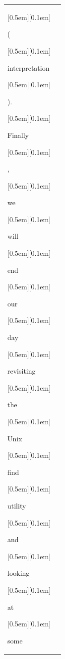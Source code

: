 \begin{table}[ht]
\begin{tabular}{@{}l p{13cm}@{}}
{\setlength{\fboxsep}{1pt}\raisebox{0pt}[0.5em][0.1em]{\colorbox{SkyBlue!55}{\strut{ (}}}}{\setlength{\fboxsep}{1pt}\raisebox{0pt}[0.5em][0.1em]{\colorbox{Salmon!60}{\strut{interpretation}}}}{\setlength{\fboxsep}{1pt}\raisebox{0pt}[0.5em][0.1em]{\colorbox{DarkOrchid!25}{\strut{).}}}}{\setlength{\fboxsep}{1pt}\raisebox{0pt}[0.5em][0.1em]{\colorbox{DarkOrchid!25}{\strut{ Finally}}}}{\setlength{\fboxsep}{1pt}\raisebox{0pt}[0.5em][0.1em]{\colorbox{DarkOrchid!25}{\strut{,}}}}{\setlength{\fboxsep}{1pt}\raisebox{0pt}[0.5em][0.1em]{\colorbox{DarkOrchid!25}{\strut{ we}}}}{\setlength{\fboxsep}{1pt}\raisebox{0pt}[0.5em][0.1em]{\colorbox{Salmon!60}{\strut{ will}}}}{\setlength{\fboxsep}{1pt}\raisebox{0pt}[0.5em][0.1em]{\colorbox{DarkOrchid!25}{\strut{ end}}}}{\setlength{\fboxsep}{1pt}\raisebox{0pt}[0.5em][0.1em]{\colorbox{SkyBlue!55}{\strut{ our}}}}{\setlength{\fboxsep}{1pt}\raisebox{0pt}[0.5em][0.1em]{\colorbox{Salmon!60}{\strut{ day}}}}{\setlength{\fboxsep}{1pt}\raisebox{0pt}[0.5em][0.1em]{\colorbox{SkyBlue!55}{\strut{ revisiting}}}}{\setlength{\fboxsep}{1pt}\raisebox{0pt}[0.5em][0.1em]{\colorbox{SkyBlue!55}{\strut{ the}}}}{\setlength{\fboxsep}{1pt}\raisebox{0pt}[0.5em][0.1em]{\colorbox{Salmon!60}{\strut{ Unix}}}}{\setlength{\fboxsep}{1pt}\raisebox{0pt}[0.5em][0.1em]{\colorbox{Salmon!60}{\strut{ find}}}}{\setlength{\fboxsep}{1pt}\raisebox{0pt}[0.5em][0.1em]{\colorbox{Salmon!60}{\strut{ utility}}}}{\setlength{\fboxsep}{1pt}\raisebox{0pt}[0.5em][0.1em]{\colorbox{SkyBlue!55}{\strut{ and}}}}{\setlength{\fboxsep}{1pt}\raisebox{0pt}[0.5em][0.1em]{\colorbox{DarkOrchid!25}{\strut{ looking}}}}{\setlength{\fboxsep}{1pt}\raisebox{0pt}[0.5em][0.1em]{\colorbox{SkyBlue!55}{\strut{ at}}}}{\setlength{\fboxsep}{1pt}\raisebox{0pt}[0.5em][0.1em]{\colorbox{SkyBlue!55}{\strut{ some}}}}


\end{tabular}
\end{table}
